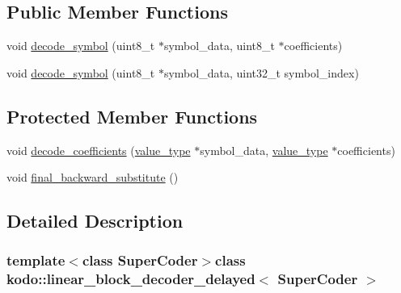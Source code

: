 \subsection*{Public Member Functions}
\begin{DoxyCompactItemize}
\item 
void \hyperlink{classkodo_1_1linear__block__decoder__delayed_a099ad86049d265c8ccf03d1dff458b63}{decode\-\_\-symbol} (uint8\-\_\-t $\ast$symbol\-\_\-data, uint8\-\_\-t $\ast$coefficients)
\begin{DoxyCompactList}\small\item\em \end{DoxyCompactList}\item 
void \hyperlink{classkodo_1_1linear__block__decoder__delayed_aeed23d2d884563a337f8ace14b7cc129}{decode\-\_\-symbol} (uint8\-\_\-t $\ast$symbol\-\_\-data, uint32\-\_\-t symbol\-\_\-index)
\begin{DoxyCompactList}\small\item\em \end{DoxyCompactList}\end{DoxyCompactItemize}
\subsection*{Protected Member Functions}
\begin{DoxyCompactItemize}
\item 
void \hyperlink{classkodo_1_1linear__block__decoder__delayed_af0711d3777ce49d2d5eb3a68bd62b1d9}{decode\-\_\-coefficients} (\hyperlink{classkodo_1_1linear__block__decoder__delayed_af82c96ec9377c711acfb52c01183dd4c}{value\-\_\-type} $\ast$symbol\-\_\-data, \hyperlink{classkodo_1_1linear__block__decoder__delayed_af82c96ec9377c711acfb52c01183dd4c}{value\-\_\-type} $\ast$coefficients)
\item 
void \hyperlink{classkodo_1_1linear__block__decoder__delayed_acede3d3cc6115c91be59a4904c337a8f}{final\-\_\-backward\-\_\-substitute} ()
\end{DoxyCompactItemize}


\subsection{Detailed Description}
\subsubsection*{template$<$class Super\-Coder$>$class kodo\-::linear\-\_\-block\-\_\-decoder\-\_\-delayed$<$ Super\-Coder $>$}


